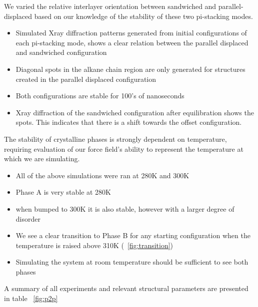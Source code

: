 \documentclass{article}
\begin{document}
\begin{itemize}
	We varied the relative interlayer orientation between sandwiched and parallel-displaced based on our knowledge of the stability of these two pi-stacking modes.
        \begin{itemize}
		\item Simulated Xray diffraction patterns generated from initial configurations of each pi-stacking mode, shows a clear relation between the parallel displaced and sandwiched configuration %
		\item Diagonal spots in the alkane chain region are only generated for structures created in the parallel displaced configuration
		\item Both configurations are stable for 100's of nanoseconds
		\item Xray diffraction of the sandwiched configuration after equilibration shows the spots. This indicates that there is a shift towards the offset configuration.
	\end{itemize} 

	The stability of crystalline phases is strongly dependent on temperature, requiring evaluation of our force field's ability to represent the temperature at which we are simulating.
	\begin{itemize}
		\item All of the above simulations were ran at 280K and 300K
		\item Phase A is very stable at 280K
		\item when bumped to 300K it is also stable, however with a larger degree of disorder %
		\item We see a clear transition to Phase B for any starting configuration when the temperature is raised above 310K (~\ref{fig:transition})
		\item Simulating the system at room temperature should be sufficient to see both phases
	\end{itemize}

	A summary of all experiments and relevant structural parameters are presented in table ~\ref{fig:p2p}


\end{itemize}
\end{document}
